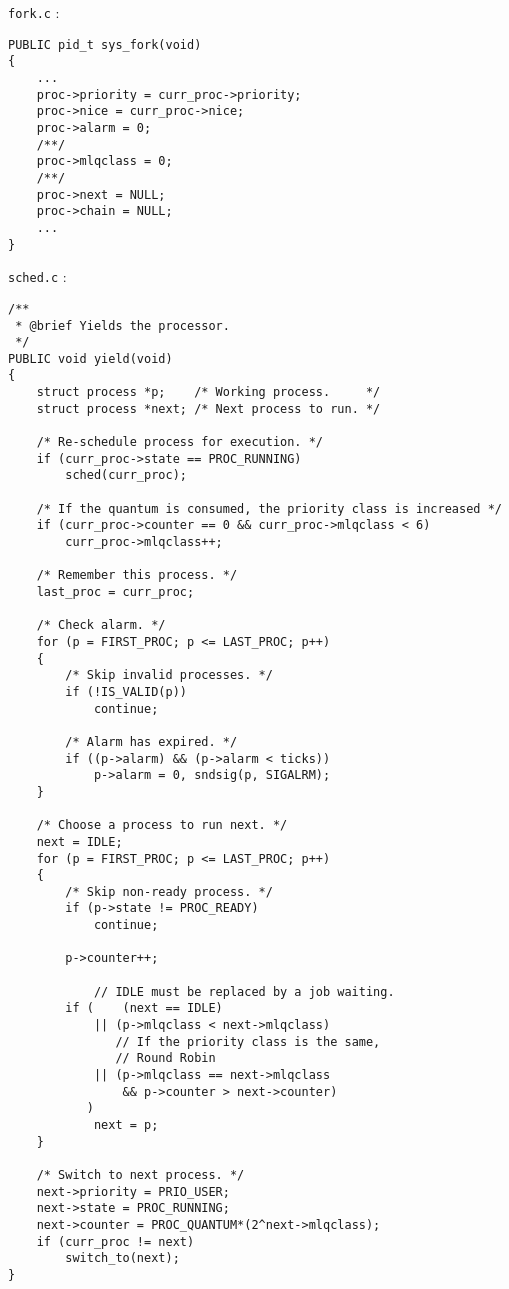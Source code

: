 \texttt{fork.c} :

\begin{lstlisting}
PUBLIC pid_t sys_fork(void)
{
	...
	proc->priority = curr_proc->priority;
	proc->nice = curr_proc->nice;
	proc->alarm = 0;
	/**/
	proc->mlqclass = 0;
	/**/
	proc->next = NULL;
	proc->chain = NULL;
	...
}
\end{lstlisting}

\texttt{sched.c} :

\begin{lstlisting}
/**
 * @brief Yields the processor.
 */
PUBLIC void yield(void)
{
	struct process *p;    /* Working process.     */
	struct process *next; /* Next process to run. */

	/* Re-schedule process for execution. */
	if (curr_proc->state == PROC_RUNNING)
		sched(curr_proc);

	/* If the quantum is consumed, the priority class is increased */
	if (curr_proc->counter == 0 && curr_proc->mlqclass < 6)
		curr_proc->mlqclass++;

	/* Remember this process. */
	last_proc = curr_proc;

	/* Check alarm. */
	for (p = FIRST_PROC; p <= LAST_PROC; p++)
	{
		/* Skip invalid processes. */
		if (!IS_VALID(p))
			continue;

		/* Alarm has expired. */
		if ((p->alarm) && (p->alarm < ticks))
			p->alarm = 0, sndsig(p, SIGALRM);
	}

	/* Choose a process to run next. */
	next = IDLE;
	for (p = FIRST_PROC; p <= LAST_PROC; p++)
	{
		/* Skip non-ready process. */
		if (p->state != PROC_READY)
			continue;

		p->counter++;

			// IDLE must be replaced by a job waiting.
		if (	(next == IDLE)
			|| (p->mlqclass < next->mlqclass)
			   // If the priority class is the same,
			   // Round Robin
			|| (p->mlqclass == next->mlqclass
				&& p->counter > next->counter)
		   )
			next = p;
	}

	/* Switch to next process. */
	next->priority = PRIO_USER;
	next->state = PROC_RUNNING;
	next->counter = PROC_QUANTUM*(2^next->mlqclass);
	if (curr_proc != next)
		switch_to(next);
}
\end{lstlisting}
